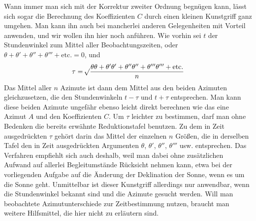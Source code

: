 Wann immer man sich mit der Korrektur zweiter Ordnung begnügen kann, lässt sich sogar die Berechnung des Koeffizienten $C$ durch einen kleinen Kunstgriff ganz umgehen. Man kann ihn auch bei mancherlei anderen Gelegenheiten mit Vorteil anwenden, und wir wollen ihn hier noch anführen. Wie vorhin sei $t$ der Stundenwinkel zum Mittel aller Beobachtungszeiten, oder $\theta+\theta'+\theta''+\theta'''+\text{etc.}=0$, und
\[
\tau=\mathord{{}^{}\!\surd}\frac{\theta\theta+\theta'\theta'+\theta''\theta''+\theta'''\theta'''+\text{etc.}}{n}
\]
Das Mittel aller $n$ Azimute ist dann dem Mittel aus den beiden Azimuten gleichzusetzen, die den Stundenwinkeln $t-\tau$ und $t+\tau$ entsprechen. Man kann diese beiden Azimute ungefähr ebenso leicht direkt berechnen wie das eine Azimut $A$ und den Koeffizienten $C$. Um $\tau$ leichter zu bestimmen, darf man ohne Bedenken die bereits erwähnte Reduktionstafel benutzen. Zu dem in Zeit ausgedrückten $\tau$ gehört darin das Mittel der einzelnen $n$ Größen, die in derselben Tafel den in Zeit ausgedrückten Argumenten $\theta$, $\theta'$, $\theta''$, $\theta'''$ usw. entsprechen. Das Verfahren empfiehlt sich auch deshalb, weil man dabei ohne zusätzlichen Aufwand auf allerlei Begleitumstände Rücksicht nehmen kann, etwa bei der vorliegenden Aufgabe auf die Änderung der Deklination der Sonne, wenn es um die Sonne geht. Unmittelbar ist dieser Kunstgriff allerdings nur anwendbar, wenn die Stundenwinkel bekannt sind und die Azimute gesucht werden. Will man beobachtete Azimutunterschiede zur Zeitbestimmung nutzen, braucht man weitere Hilfsmittel, die hier nicht zu erläutern sind.

